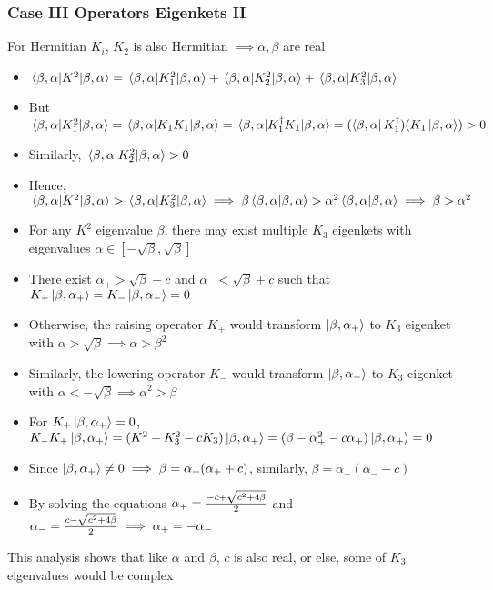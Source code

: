 \documentclass[8pt,t,mathserif,aspectratio=169]{beamer}
\begin{document}
\begin{frame}
  \frametitle{Case III Operators Eigenkets II}
  \vspace{1mm}
  For Hermitian $K_i$, $K_{2}$ is also Hermitian $\implies \alpha,\beta$ are real
  \begin{itemize}
    \item $\expval{K^2}{\beta,\alpha} = \expval{K_{1}^{2}}{\beta,\alpha} + \expval{K_{2}^{2}}{\beta,\alpha} + \expval{K_{3}^{2}}{\beta,\alpha}$
    \item But $\expval{K_{1}^{2}}{\beta,\alpha} = \expval{K_1 K_1}{\beta,\alpha} = \expval{K_{1}^{\dagger} K_1}{\beta,\alpha} = (\bra{\beta,\alpha} K_{1}^{\dagger}) (K_1 \ket{\beta,\alpha}) > 0$
    \item Similarly, $\expval{K_{2}^{2}}{\beta,\alpha} > 0$
    \item Hence, $\expval{K^2}{\beta,\alpha} > \expval{K_{3}^{2}}{\beta,\alpha} \implies \beta \braket{{\beta,\alpha}} > \alpha^2 \braket{{\beta,\alpha}} \implies \beta > \alpha^2$
    \item For any $K^2$ eigenvalue $\beta$, there may exist multiple $K_3$ eigenkets with eigenvalues $\alpha \in [-\sqrt{\beta},\sqrt{\beta}]$ 
    \item There exist $\alpha_{+} > \sqrt{\beta} - c$ and $\alpha_{-} < \sqrt{\beta} + c$ such that $K_{+} \ket{\beta,\alpha_{+}} = K_{-} \ket{\beta,\alpha_{-}} = 0$
    \item Otherwise, the raising operator $K_{+}$ would transform $\ket{\beta,\alpha_{+}}$ to $K_3$ eigenket with $\alpha > \sqrt{\beta} \implies \alpha > \beta^2$
    \item Similarly, the lowering operator $K_{-}$ would transform $\ket{\beta,\alpha_{-}}$ to $K_3$ eigenket with $\alpha < -\sqrt{\beta} \implies \alpha^2 > \beta$
    \item For $K_{+} \ket{\beta,\alpha_{+}} = 0$, $K_{-} K_{+} \ket{\beta,\alpha_{+}} = (K^{2} - K_{3}^{2} - c K_3) \ket{\beta,\alpha_{+}} = (\beta - \alpha_{+}^2 - c \alpha_{+}) \ket{\beta,\alpha_{+}} = 0$
    \item Since $\ket{\beta,\alpha_{+}} \neq 0 \implies \beta = \alpha_{+}(\alpha_{+} + c)$, similarly, $\beta = \alpha_{-}(\alpha_{-} - c)$
    \item By solving the equations $\alpha_{+} = {-c + \sqrt{c^2 + 4 \beta} \over 2}$ and $\alpha_{-} = {c - \sqrt{c^2 + 4 \beta} \over 2} \implies \alpha_{+} = -\alpha_{-}$
  \end{itemize}
  This analysis shows that like $\alpha$ and $\beta$, $c$ is also real, or else, some of $K_3$ eigenvalues would be complex
\end{frame}
\end{document}
